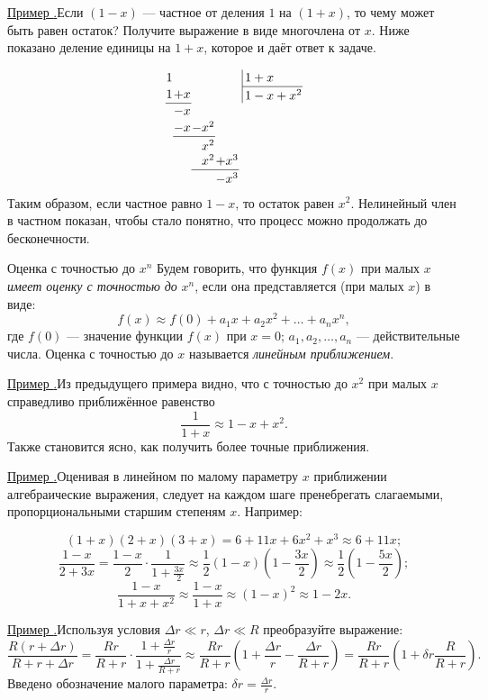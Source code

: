 \documentclass[10pt, xetex]{article}
\newcounter{zadacha}
\newcommand{\z}{\par\vspace{0.6\baselineskip plus 1pt minus 1pt}\noindent\addtocounter{zadacha}{1}\hypertarget{z\thezadacha}{}\hyperlink{an\thezadacha}{{Пример {\arabic{zadacha}.}\:\hskip0.15mm}}}
\begin{document}
\z Если $(1-x)$ --- частное от деления $1$ на $(1+x)$, то чему может быть равен остаток? Получите выражение в виде многочлена от $x$. 
\baselineskip
 Ниже показано деление единицы на $1+x$, которое и даёт ответ к задаче.  

\[
\arraycolsep=0.05em
\renewcommand{\arraystretch}{1.1}
\begin{array}{rrrrr@{\,}r|l}
1&&&&&& {\,}1+x\\
\cline{7-7}
1&+x&&&&&   {\,}{\vcenter{\hbox{$1-x+x^{2}$}}}\\
\cline{1-2}
&-x&  \\
&-x& -x^{2} \\
\cline{2-3}
& & {\vcenter{\hbox{$x^{2}$}}}\\
& & x^{2}&  +x^{3}\\
\cline{3-4}
& & &  {\vcenter{\hbox{$-x^{3}$}}}
\end{array}
\]
Таким образом, если частное равно $1-x$, то остаток равен $x^{2}$. Нелинейный член в частном показан, чтобы стало понятно, что процесс можно продолжать до бесконечности. 

\baselineskip
\begin{bclogo}[logo=\bccrayon, margeG=-0.4, margeD=0, noborder = true, couleurBarre = darkred]{Оценка с точностью до $x^{n}$}
Будем говорить, что функция $f(x)$ при малых $x$ \textit{имеет оценку с точностью до} $x^{n}$, если она представляется (при малых $x$) в виде: 
\begin{equation*}
f(x) \approx f(0)+a_{1}x+a_{2}x^{2}+\ldots+a_{n}x^{n},
\label{small_x_approx}
\end{equation*}
где $f(0)$ --- значение функции $f(x)$ при $x=0$; $a_{1}, a_{2},\ldots,a_{n}$ --- действительные числа. Оценка с точностью до $x$ называется \textit{линейным приближением}.
\end{bclogo}
\baselineskip
\z Из предыдущего примера видно, что с точностью до $x^{2}$ при малых $x$ справедливо приближённое равенство
\[
\frac{1}{1+x} \approx 1-x+x^{2}.
\]
Также становится ясно, как получить более точные приближения. 

\z Оценивая в линейном по малому параметру $x$ приближении алгебраические выражения, следует на каждом шаге пренебрегать слагаемыми, пропорциональными старшим степеням $x$. Например:

\[
(1+x)(2+x)(3+x)= 6 + 11x+6x^{2}+x^{3}\approx 6 + 11x;
\]
\[
\frac{1-x}{2+3x} = \frac{1-x}{2}\cdot \frac{1}{1+\frac{3x}{2}}\approx \frac{1}{2}(1-x)\left(1-\frac{3x}{2}\right)\approx \frac{1}{2}\left(1-\frac{5x}{2}\right);
\]
\[
\frac{1-x}{1+x+x^{2}} \approx \frac{1-x}{1+x}\approx (1-x)^{2}\approx 1-2x.
\]
\z Используя условия $\Delta r \ll r$, $\Delta r \ll R$ преобразуйте выражение:
 \[
\frac{R(r + \Delta r)}{R+r + \Delta r} = \frac{Rr}{R+r}\cdot \frac{1+\frac{\Delta r}{r}}{1+\frac{\Delta r}{R+r}}\approx \frac{Rr}{R+r}\left(1+\frac{\Delta r}{r}-\frac{\Delta r}{R+r} \right)=\frac{Rr}{R+r}\left(1+\delta r\frac{R}{R+r} \right).
\]
Введено обозначение малого параметра: $\delta r = \displaystyle{\frac{\Delta r}{r}}$.
\end{document}
